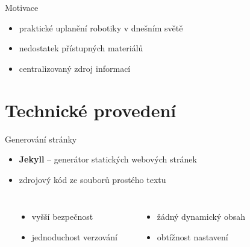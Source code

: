 \documentclass[14pt, hyperref={unicode}]{beamer}
\title{\makebox[\linewidth]{Robotika jednoduše}}
\date{\today}
\author{Tomáš Sláma}
\institute{Gymnázium Turnov}
\newcommand{\NA}{\faIcon{minus}}
\begin{document}
  \maketitle

  \begin{frame}{Motivace}
    \begin{itemize}
      \item<+-> praktické uplanění robotiky v dnešním světě
      \item<+-> nedostatek přístupných materiálů
      \item<+-> centralizovaný zdroj informací
    \end{itemize}
  \end{frame}

  \section{Technické provedení}

  \begin{frame}{Generování stránky}
    \begin{itemize}
      \item<+-> \textbf{Jekyll} -- generátor statických webových stránek
      \item<+-> zdrojový kód ze souborů prostého textu
    \end{itemize}

    \begin{columns}[T, onlytextwidth]
      \footnotesize
        \begin{center}
        \end{center}
        \begin{itemize}[<+- | alert@+>]
          \item vyšší bezpečnost
          \item jednoduchost verzování
        \end{itemize}
        \begin{center}
          \NA
        \end{center}
        \begin{itemize}[<+- | alert@+>]
          \item žádný dynamický obsah
          \item obtížnost nastavení
        \end{itemize}
    \end{columns}
  \end{frame}
\end{document}

